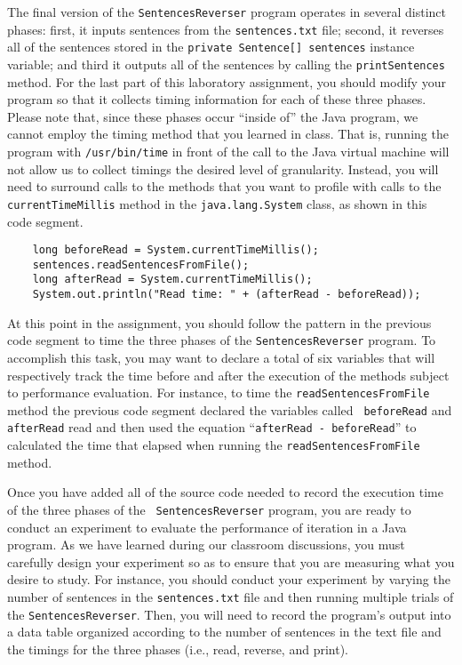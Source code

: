 The final version of the {\tt SentencesReverser} program operates in several distinct phases: first, it inputs sentences
from the {\tt sentences.txt} file; second, it reverses all of the sentences stored in the {\tt private Sentence[]
sentences} instance variable; and third it outputs all of the sentences by calling the {\tt printSentences} method. For
the last part of this laboratory assignment, you should modify your program so that it collects timing information for
each of these three phases. Please note that, since these phases occur ``inside of'' the Java program, we cannot employ
the timing method that you learned in class. That is, running the program with {\tt /usr/bin/time} in front of the call
to the Java virtual machine will not allow us to collect timings the desired level of granularity. Instead, you will
need to surround calls to the methods that you want to profile with calls to the {\tt currentTimeMillis} method in the
{\tt java.lang.System} class, as shown in this code segment.

\begin{verbatim}
    long beforeRead = System.currentTimeMillis();
    sentences.readSentencesFromFile();
    long afterRead = System.currentTimeMillis();
    System.out.println("Read time: " + (afterRead - beforeRead));
\end{verbatim}

At this point in the assignment, you should follow the pattern in the previous code segment to time the three phases of
the {\tt SentencesReverser} program. To accomplish this task, you may want to declare a total of six variables that will
respectively track the time before and after the execution of the methods subject to performance evaluation. For
instance, to time the {\tt readSentencesFromFile} method the previous code segment declared the variables called {\tt
beforeRead} and {\tt afterRead} read and then used the equation ``{\tt afterRead - beforeRead}'' to calculated the time
that elapsed when running the {\tt readSentencesFromFile} method.

Once you have added all of the source code needed to record the execution time of the three phases of the {\tt
SentencesReverser} program, you are ready to conduct an experiment to evaluate the performance of iteration in a Java
program. As we have learned during our classroom discussions, you must carefully design your experiment so as to ensure
that you are measuring what you desire to study. For instance, you should conduct your experiment by varying the number
of sentences in the {\tt sentences.txt} file and then running multiple trials of the {\tt SentencesReverser}. Then, you
will need to record the program's output into a data table organized according to the number of sentences in the text
file and the timings for the three phases (i.e., read, reverse, and print).

